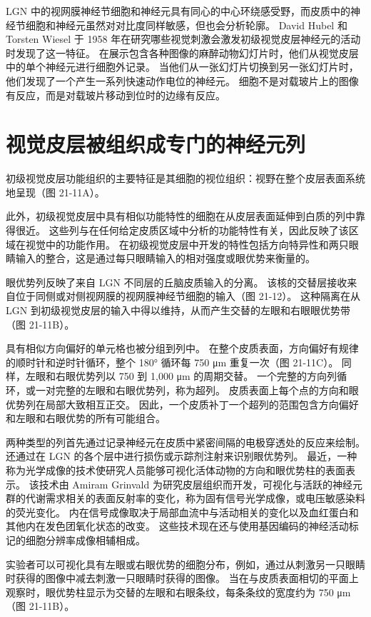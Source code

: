 LGN 中的视网膜神经节细胞和神经元具有同心的中心环绕感受野，而皮质中的神经节细胞和神经元虽然对对比度同样敏感，但也会分析轮廓。 David Hubel 和 Torsten Wiesel 于 1958 年在研究哪些视觉刺激会激发初级视觉皮层神经元的活动时发现了这一特征。 在展示包含各种图像的麻醉动物幻灯片时，他们从视觉皮层中的单个神经元进行细胞外记录。 当他们从一张幻灯片切换到另一张幻灯片时，他们发现了一个产生一系列快速动作电位的神经元。 细胞不是对载玻片上的图像有反应，而是对载玻片移动到位时的边缘有反应。


\section{视觉皮层被组织成专门的神经元列}
初级视觉皮层功能组织的主要特征是其细胞的视位组织：视野在整个皮层表面系统地呈现（图 21-11A）。

此外，初级视觉皮层中具有相似功能特性的细胞在从皮层表面延伸到白质的列中靠得很近。 这些列与在任何给定皮质区域中分析的功能特性有关，因此反映了该区域在视觉中的功能作用。 在初级视觉皮层中开发的特性包括方向特异性和两只眼睛输入的整合，这是通过每只眼睛输入的相对强度或眼优势来衡量的。

眼优势列反映了来自 LGN 不同层的丘脑皮质输入的分离。 该核的交替层接收来自位于同侧或对侧视网膜的视网膜神经节细胞的输入（图 21-12）。 这种隔离在从 LGN 到初级视觉皮层的输入中得以维持，从而产生交替的左眼和右眼眼优势带（图 21-11B）。

具有相似方向偏好的单元格也被分组到列中。 在整个皮质表面，方向偏好有规律的顺时针和逆时针循环，整个 180° 循环每 750 μm 重复一次（图 21-11C）。 同样，左眼和右眼优势列以 750 到 1,000 μm 的周期交替。 一个完整的方向列循环，或一对完整的左眼和右眼优势列，称为超列。 皮质表面上每个点的方向和眼优势列在局部大致相互正交。 因此，一个皮质补丁一个超列的范围包含方向偏好和左眼和右眼优势的所有可能组合。

两种类型的列首先通过记录神经元在皮质中紧密间隔的电极穿透处的反应来绘制。 还通过在 LGN 的各个层中进行损伤或示踪剂注射来识别眼优势列。 最近，一种称为光学成像的技术使研究人员能够可视化活体动物的方向和眼优势柱的表面表示。 该技术由 Amiram Grinvald 为研究皮层组织而开发，可视化与活跃的神经元群的代谢需求相关的表面反射率的变化，称为固有信号光学成像，或电压敏感染料的荧光变化。 内在信号成像取决于局部血流中与活动相关的变化以及血红蛋白和其他内在发色团氧化状态的改变。 这些技术现在还与使用基因编码的神经活动标记的细胞分辨率成像相辅相成。

实验者可以可视化具有左眼或右眼优势的细胞分布，例如，通过从刺激另一只眼睛时获得的图像中减去刺激一只眼睛时获得的图像。 当在与皮质表面相切的平面上观察时，眼优势柱显示为交替的左眼和右眼条纹，每条条纹的宽度约为 750 μm（图 21-11B）。

